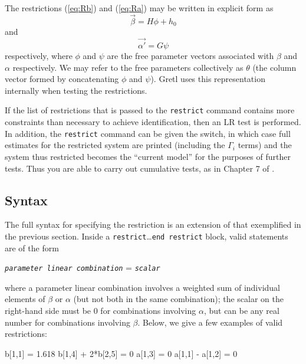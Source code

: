 The restrictions (\ref{eq:Rb}) and (\ref{eq:Ra}) may be written in
explicit form as
\begin{equation}
\label{eq:vecbeta}
\vec{\beta} = H\phi + h_0
\end{equation}
and
\begin{equation}
\label{eq:vecalpha}
\vec{\alpha'} = G\psi
\end{equation}
respectively, where $\phi$ and $\psi$ are the free parameter vectors
associated with $\beta$ and $\alpha$ respectively.  We may refer
to the free parameters collectively as $\theta$ (the column vector
formed by concatenating $\phi$ and $\psi$).  Gretl uses this
representation internally when testing the restrictions.

If the list of restrictions that is passed to the \texttt{restrict}
command contains more constraints than necessary to achieve
identification, then an LR test is performed. In addition, the
\texttt{restrict} command can be given the  switch, in
which case full estimates for the restricted system are printed
(including the $\Gamma_i$ terms) and the system thus restricted
becomes the ``current model'' for the purposes of further tests.  Thus
you are able to carry out cumulative tests, as in Chapter 7 of
\cite{johansen95}.

\subsection{Syntax}
\label{sec:vecm-restr-syntax}

The full syntax for specifying the restriction is an extension of
that exemplified in the previous section. Inside a
\texttt{restrict}\ldots\texttt{end restrict} block, valid statements
are of the form
\begin{center}
  \texttt{\emph{parameter linear combination}} = \emph{\texttt{scalar}}
\end{center}
where a parameter linear combination involves a weighted sum of
individual elements of $\beta$ or $\alpha$ (but not both in the same
combination); the scalar on the right-hand side must be 0 for
combinations involving $\alpha$, but can be any real number for
combinations involving $\beta$. Below, we give a few examples of valid
restrictions:
\begin{code}
  b[1,1] = 1.618
  b[1,4] + 2*b[2,5] = 0
  a[1,3] = 0
  a[1,1] - a[1,2] = 0
\end{code}

